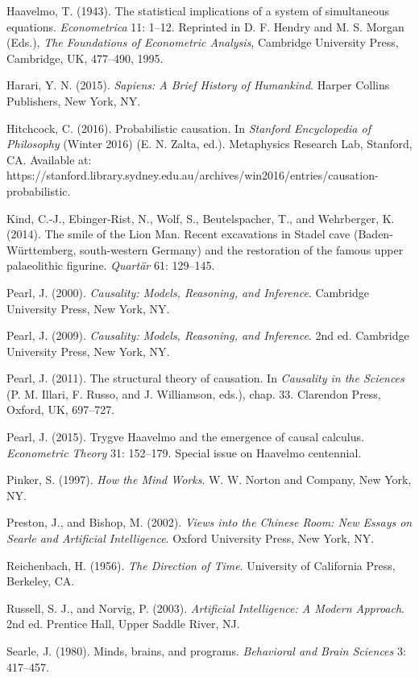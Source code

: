 \documentclass[11pt,a5paper,twoside]{book}
\begin{document}
Haavelmo, T. (1943). The statistical implications of a system of simultaneous equations. \textit{Econometrica} 11: 1–12. Reprinted in D. F. Hendry and M. S. Morgan (Eds.), \textit{The Foundations of Econometric Analysis}, Cambridge University Press, Cambridge, UK, 477–490, 1995.

Harari, Y. N. (2015). \textit{Sapiens: A Brief History of Humankind}. Harper Collins Publishers, New York, NY.

Hitchcock, C. (2016). Probabilistic causation. In \textit{Stanford Encyclopedia of Philosophy} (Winter 2016) (E. N. Zalta, ed.). Metaphysics Research Lab, Stanford, CA. Available at: https://stanford.library.sydney.edu.au/archives/win2016/entries/causation-probabilistic.

Kind, C.-J., Ebinger-Rist, N., Wolf, S., Beutelspacher, T., and Wehrberger, K. (2014). The smile of the Lion Man. Recent excavations in Stadel cave (Baden-Württemberg, south-western Germany) and the restoration of the famous upper palaeolithic figurine. \textit{Quartär} 61: 129–145.

Pearl, J. (2000). \textit{Causality: Models, Reasoning, and Inference}. Cambridge University Press, New York, NY.

Pearl, J. (2009). \textit{Causality: Models, Reasoning, and Inference}. 2nd ed. Cambridge University Press, New York, NY.

Pearl, J. (2011). The structural theory of causation. In \textit{Causality in the Sciences} (P. M. Illari, F. Russo, and J. Williamson, eds.), chap. 33. Clarendon Press, Oxford, UK, 697–727.

Pearl, J. (2015). Trygve Haavelmo and the emergence of causal calculus. \textit{Econometric Theory} 31: 152–179. Special issue on Haavelmo centennial.

Pinker, S. (1997). \textit{How the Mind Works}. W. W. Norton and Company, New York, NY.

Preston, J., and Bishop, M. (2002). \textit{Views into the Chinese Room: New Essays on Searle and Artificial Intelligence}. Oxford University Press, New York, NY.

Reichenbach, H. (1956). \textit{The Direction of Time}. University of California Press, Berkeley, CA.

Russell, S. J., and Norvig, P. (2003). \textit{Artificial Intelligence: A Modern Approach}. 2nd ed. Prentice Hall, Upper Saddle River, NJ.

Searle, J. (1980). Minds, brains, and programs. \textit{Behavioral and Brain Sciences} 3: 417–457.
\end{document}
